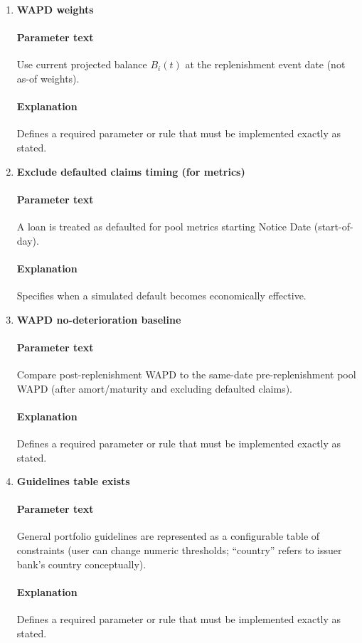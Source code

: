 \documentclass[11pt]{article}
\begin{document}
\begin{enumerate}[label=\arabic*),leftmargin=*,align=left]
\item \textbf{WAPD weights}
\paragraph{Parameter text} Use current projected balance $B_i(t)$ at the replenishment event date (not as-of weights).
\paragraph{Explanation} Defines a required parameter or rule that must be implemented exactly as stated.

\item \textbf{Exclude defaulted claims timing (for metrics)}
\paragraph{Parameter text} A loan is treated as defaulted for pool metrics starting Notice Date (start-of-day).
\paragraph{Explanation} Specifies when a simulated default becomes economically effective.

\item \textbf{WAPD no-deterioration baseline}
\paragraph{Parameter text} Compare post-replenishment WAPD to the same-date pre-replenishment pool WAPD (after amort/maturity and excluding defaulted claims).
\paragraph{Explanation} Defines a required parameter or rule that must be implemented exactly as stated.

\item \textbf{Guidelines table exists}
\paragraph{Parameter text} General portfolio guidelines are represented as a configurable table of constraints (user can change numeric thresholds; ``country'' refers to issuer bank’s country conceptually).
\paragraph{Explanation} Defines a required parameter or rule that must be implemented exactly as stated.


\end{enumerate}
\end{document}
